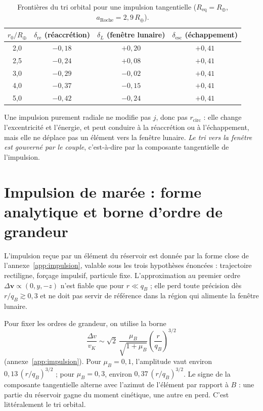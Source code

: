 \documentclass[11pt,a4paper,openany]{report}
\newcommand{\Rt}{R_{\oplus}}
\newcommand{\Req}{R_{\mathrm{eq}}}
\newcommand{\aR}{a_{\mathrm{Roche}}}
\begin{document}
\begin{table}[htbp]
\centering
\small
\caption{Frontières du tri orbital pour une impulsion tangentielle ($\Req=\Rt$, $\aR=2{,}9\,\Rt$).}
\label{tab:frontieres}
\begin{tabular}{cccc}
\toprule
$r_0/\Rt$ & $\delta_{\mathrm{re}}$ (réaccrétion) & $\delta_L$ (fenêtre lunaire) & $\delta_{\mathrm{esc}}$ (échappement) \\
\midrule
2{,}0 & $-0{,}18$ & $+0{,}20$ & $+0{,}41$ \\
2{,}5 & $-0{,}24$ & $+0{,}08$ & $+0{,}41$ \\
3{,}0 & $-0{,}29$ & $-0{,}02$ & $+0{,}41$ \\
4{,}0 & $-0{,}37$ & $-0{,}15$ & $+0{,}41$ \\
5{,}0 & $-0{,}42$ & $-0{,}24$ & $+0{,}41$ \\
\bottomrule
\end{tabular}
\end{table}

Une impulsion purement radiale ne modifie pas $j$, donc pas $r_{\mathrm{circ}}$ : elle change
l'excentricité et l'énergie, et peut conduire à la réaccrétion ou à l'échappement, mais elle ne
déplace pas un élément vers la fenêtre lunaire. \emph{Le tri vers la fenêtre est gouverné par le
couple}, c'est-à-dire par la composante tangentielle de l'impulsion.

\section{Impulsion de marée : forme analytique et borne d'ordre de grandeur}

L'impulsion reçue par un élément du réservoir est donnée par la forme close de
l'annexe~\ref{app:impulsion}, valable sous les trois hypothèses énoncées : trajectoire rectiligne,
forçage impulsif, particule fixe. L'approximation au premier ordre
$\Delta\mathbf{v}\propto(0,y,-z)$ n'est fiable que pour $r\ll q_B$ ; elle perd toute précision dès
$r/q_B\gtrsim0{,}3$ et ne doit pas servir de référence dans la région qui alimente la fenêtre
lunaire.

Pour fixer les ordres de grandeur, on utilise la borne
\begin{equation}
\frac{\Delta v}{v_K}\sim\sqrt2\,\frac{\mu_B}{\sqrt{1+\mu_B}}
\left(\frac{r}{q_B}\right)^{3/2}
\label{eq:impulsion}
\end{equation}
(annexe~\ref{app:impulsion}). Pour $\mu_B=0{,}1$, l'amplitude vaut environ $0{,}13\,(r/q_B)^{3/2}$ ;
pour $\mu_B=0{,}3$, environ $0{,}37\,(r/q_B)^{3/2}$. Le signe de la composante tangentielle alterne
avec l'azimut de l'élément par rapport à $B$ : une partie du réservoir gagne du moment cinétique,
une autre en perd. C'est littéralement le tri orbital.
\end{document}
